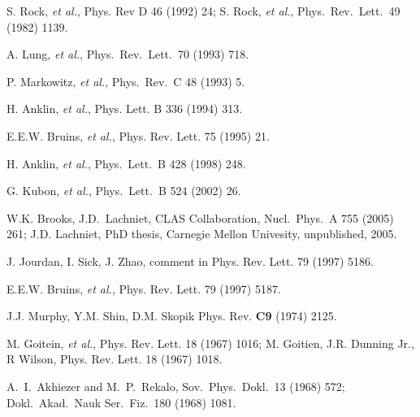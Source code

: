 \begin{thebibliography}{PPV06}
S. Rock, {\it et al.}, Phys. Rev D  46 (1992) 24; S. Rock, {\it et al.},
Phys.\ Rev.\ Lett.\  49 (1982) 1139.

A. Lung, {\it et al.},
Phys.\ Rev.\ Lett.\   70 (1993) 718.

P. Markowitz, {\it et al.},
Phys.\ Rev.\ C  48 (1993) 5.

H. Anklin, {\it et al.}, Phys. Lett. B  336 (1994) 313.

E.E.W. Bruins, {\it et al.}, Phys. Rev. Lett. 75 (1995) 21.

H. Anklin, {\it et al.},
Phys.\ Lett.\ B  428 (1998) 248.

G. Kubon, {\it et al.},
Phys.\ Lett.\ B 524 (2002) 26. 

W.K. Brooks, J.D.~Lachniet, CLAS Collaboration,
  Nucl.\ Phys.\ A  755 (2005) 261;
J.D. Lachniet, %
PhD thesis, Carnegie Mellon Univesity, unpublished, 2005.

J. Jourdan, I. Sick, J. Zhao, 
comment in Phys. Rev. Lett. 79 (1997) 5186.


E.E.W. Bruins, {\it et al.}, Phys. Rev. Lett. 79 (1997) 5187.

J.J. Murphy, Y.M. Shin, D.M. Skopik
Phys. Rev. {\bf C9} (1974) 2125.

M. Goitein, {\it et al.}, Phys. Rev. Lett. 18 (1967) 1016; M. Goitien, J.R. Dunning Jr., R Wilson, Phys. Rev. Lett. 18 (1967) 1018. 

  A.~I.~Akhiezer and M.~P.~Rekalo,
  Sov.\ Phys.\ Dokl.\   13 (1968) 572; 
  Dokl.\ Akad.\ Nauk Ser.\ Fiz.\  180 (1968) 1081.


\end{thebibliography}
